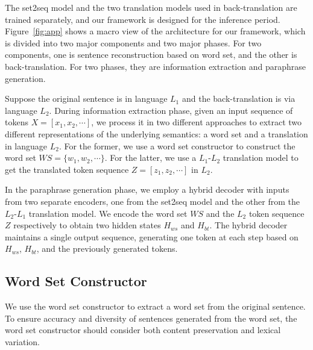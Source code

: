 The set2seq model and the two translation models used in back-translation are trained separately, and our framework is designed for the inference period. Figure~\ref{fig:app} shows a macro view of the architecture for our framework, which is divided into two major components and two major phases. For two components, one is sentence reconstruction based on word set, and the other is back-translation. For two phases, they are information extraction and paraphrase generation.


Suppose the original sentence is in language $L_1$ and the back-translation is via language $L_2$. During information extraction phase, given an input sequence of tokens $X = [x_1, x_2, \cdots]$, we process it in two different approaches to extract two different representations of the underlying semantics: a word set and a translation in language $L_2$. For the former, we use a word set constructor to construct the word set $WS = \{w_1, w_2,\cdots\}$. For the latter, we use a $L_1$-$L_2$ translation model to get the translated token sequence $Z = [z_1, z_2, \cdots]$ in $L_2$. 


In the paraphrase generation phase, we employ a hybrid decoder with inputs from two separate encoders, one from the set2seq model and the other from the $L_2$-$L_1$ translation model. We encode the word set $WS$ and the $L_2$ token sequence $Z$ respectively to obtain two hidden states $H_{ws}$ and $H_{bt}$. The hybrid decoder maintains a single output sequence, generating one token at each step based on $H_{ws}$, $H_{bt}$, and the previously generated tokens.


\subsection{Word Set Constructor} \label{sec:wordset}
We use the word set constructor to extract a word set from the original sentence. To ensure accuracy and diversity of sentences generated from the word set, the word set constructor should consider both content preservation and lexical variation.

